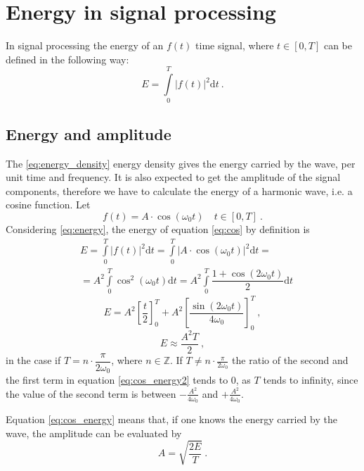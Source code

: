 \documentclass[a4paper,12pt,oneside]{article}
\newcommand{\dt}{\mathrm{d}t}
\begin{document}
\section{Energy in signal processing}

In signal processing the energy of an $f(t)$ time signal, where $t\in[0,T]$ can be defined in the following way:
\begin{equation}\label{eq:energy}
  E = \int\limits_0^T |f(t)|^2 \dt \ .
\end{equation}

\subsection{Energy and amplitude}

The \eqref{eq:energy_density} energy density gives the energy carried by the wave, per unit time and frequency. It is also expected to get the amplitude of the signal components, therefore we have to calculate the energy of a harmonic wave, i.e. a cosine function. Let
\begin{equation}\label{eq:cos}
  f(t) = A \cdot \cos(\omega_0 t) \quad t \in[0, T] \ .
\end{equation}
Considering \eqref{eq:energy}, the energy of equation \eqref{eq:cos} by definition is
\begin{eqnarray}\label{eq:cos_energy}
  & E = \int\limits_0^T |f(t)|^2 \dt = \int\limits_0^T |A \cdot \cos(\omega_0 t)|^2 \dt = \nonumber\\
  & = A^2 \int\limits_0^T \cos^2(\omega_0 t) \dt = A^2 \int\limits_0^T \dfrac{1 + \cos(2\omega_0 t)}{2} \dt
\end{eqnarray}
\begin{equation}\label{eq:cos_energy2}
  E = A^2 \left[\dfrac{t}{2}\right]_0^T + A^2 \left[\dfrac{\sin(2\omega_0 t)}{4\omega_0}\right]_0^T\ , 
\end{equation}
\begin{equation}\label{eq:cos_energy3}
  E \approx \dfrac{A^2 T}{2} \ ,
\end{equation}
in the case if $T = n\cdot \dfrac{\pi}{2\omega_0}$, where $n \in \mathbb{Z}$. If $T \neq n\cdot \frac{\pi}{2\omega_0}$ the ratio of the second and the first term in equation \eqref{eq:cos_energy2} tends to $0$, as $T$ tends to infinity, since the value of the second term is between $-\frac{A^2}{4 \omega_0}$ and $+\frac{A^2}{4 \omega_0}$.

Equation \eqref{eq:cos_energy} means that, if one knows the energy carried by the wave, the amplitude can be evaluated by
\begin{equation}\label{eq:amplitude}
  A = \sqrt{\dfrac{2 E}{T}} \ .
\end{equation}
\end{document}
